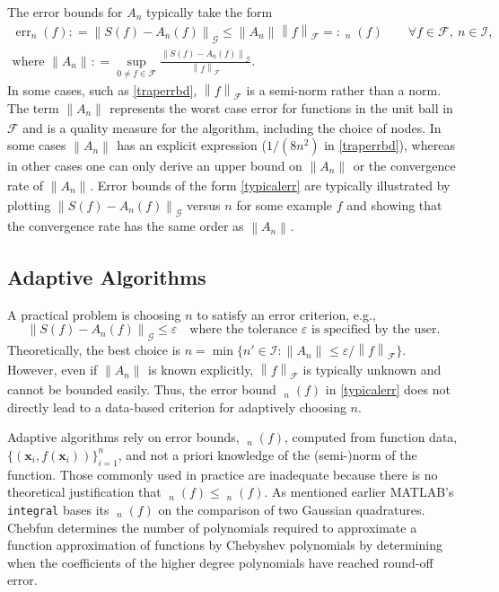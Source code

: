 \documentclass[11pt]{NSFamsart}
\DeclareMathOperator{\err}{err}
\DeclareMathOperator{\oerr}{\overline{\err}}
\DeclareMathOperator{\herr}{\widehat{\err}}
\newcommand{\bx}{{\boldsymbol{x}}}
\newcommand{\calf}{{\mathcal{F}}}
\newcommand{\calI}{{\mathcal{I}}}
\newcommand{\calg}{{\mathcal{G}}}
\newcommand{\norm}[2][{}]{\ensuremath{\left \lVert #2 \right \rVert}_{#1}}
\begin{document}
The error bounds  for $A_n$ typically take the  form
\begin{gather} \label{typicalerr}
\err_n(f): = \norm[\calg]{S(f) - A_n(f)} \le \norm{A_n} \norm[\calf]{f} =: \oerr_n(f) \qquad \forall f \in 
\calf, \ n \in 
\calI, 
\\ \text{where }\norm{A_n}  : = \sup_{0 \ne f \in \calf} \frac{\norm[\calg]{S(f) - A_n(f)}} 
{\norm[\calf]{f}}.
\end{gather} 
In some cases, such as  \eqref{traperrbd}, $\norm[\calf]{f}$ is a 
semi-norm rather than a norm.  The term $\norm{A_n}$
represents the worst case error for functions in the unit ball in $\calf$ and is a quality measure for 
the algorithm, including the
choice of nodes.  In some cases 
$\norm{A_n}$ has an explicit expression ($1/(8n^2)$ in \eqref{traperrbd}), whereas in other 
cases one 
can only derive an upper bound on $\norm{A_n}$ or the convergence rate of 
$\norm{A_n}$. 
Error bounds of the form  \eqref{typicalerr} are typically 
illustrated by plotting $\norm[\calg]{S(f) - A_n(f)}$ versus $n$ for some example $f$ and showing 
that the 
convergence rate has the same order as $\norm{A_n}$.

\subsection{Adaptive Algorithms} A practical problem is choosing  $n$ to satisfy an 
error criterion, e.g.,
\begin{equation} \label{errorcrit}
\norm[\calg]{S(f) - A_n(f)} \le \varepsilon \quad \text{where the tolerance } \varepsilon 
\text{ is 
specified by the user}.
\end{equation}
Theoretically, the best choice is $n = \min \{ n' \in \calI : \norm{A_n} \le \varepsilon / 
\norm[\calf]{f}\}$.  However, even if $\norm{A_n}$ is known explicitly, $\norm[\calf]{f}$ is 
typically 
unknown and cannot be 
bounded easily.  Thus, the error bound $\oerr_n(f)$ in \eqref{typicalerr} does not directly lead to
a  data-based
criterion for adaptively choosing $n$.  

Adaptive algorithms rely on error bounds, $\herr_n(f)$, computed from function data, 
$\{(\bx_i,f(\bx_i))\}_{i=1}^n$, and not a priori knowledge of the (semi-)norm of the function.  Those 
commonly used in practice are inadequate because there is no theoretical justification that 
$\oerr_n(f)  \le \herr_n(f)$.  As mentioned earlier MATLAB's \texttt{integral} bases its $\herr_n(f)$ on 
the comparison of two Gaussian quadratures.  Chebfun determines the number of polynomials 
required to approximate a function approximation of functions by Chebyshev polynomials by 
determining when the coefficients of the higher degree polynomials have reached round-off 
error.
\end{document}
